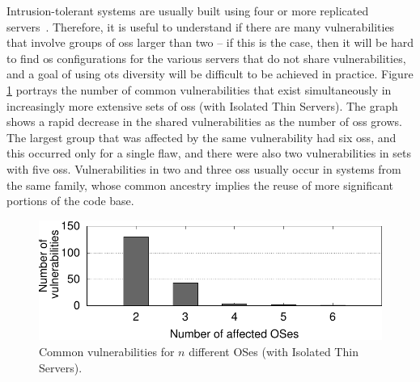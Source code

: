 Intrusion-tolerant systems are usually built using four or more replicated servers~\cite{Castro:2002}. 
Therefore, it is useful to understand if there are many vulnerabilities that involve groups of \glspl{os} larger than two -- if this is the case, then it will be hard to find \gls{os} configurations for the various servers that do not share vulnerabilities, and a goal of using \gls{ots} diversity will be difficult to be achieved in practice. 
Figure \ref{top} portrays the number of common vulnerabilities that exist simultaneously in increasingly more extensive sets of \glspl{os} (with Isolated Thin Servers). 
The graph shows a rapid decrease in the shared vulnerabilities as the number of \glspl{os} grows. 
The largest group that was affected by the same vulnerability had six \glspl{os}, and this occurred only for a single flaw, and there were also two vulnerabilities in sets with five \glspl{os}. Vulnerabilities in two and three \glspl{os} usually occur in systems from the same family, whose common ancestry implies the reuse of more significant portions of the code base.

\begin{figure}[!h]
 \centering
 \includegraphics[]{images/gnuplot/spe/top/top.pdf}
 \caption{Common vulnerabilities for $n$ different OSes (with Isolated Thin Servers).}
 \label{top}
\end{figure}


